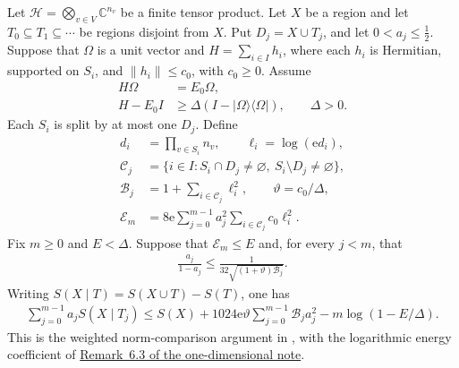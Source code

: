 \begin{theorem}
    \label{thm:buffer_weighted_logarithmic}
    \leanok
    Let $\mathcal H=\bigotimes_{v\in V}\mathbb C^{n_v}$ be a finite
    tensor product. Let $X$ be a region and let
    $T_0\subseteq T_1\subseteq\cdots$ be regions disjoint from $X$.
    Put $D_j=X\cup T_j$, and let $0<a_j\le\tfrac12$.
    Suppose that $\Omega$ is a unit vector and $H=\sum_{i\in I}h_i$,
    where each $h_i$ is Hermitian, supported on $S_i$, and
    $\lVert h_i\rVert\le c_0$, with $c_0\ge0$. Assume
    \begin{align*}
        H\Omega & =E_0\Omega,                                          \\
        H-E_0I  & \ge\Delta(I-\lvert\Omega\rangle\langle\Omega\rvert),
        \qquad \Delta>0.
    \end{align*}
    Each $S_i$ is split by at most one $D_j$. Define
    \begin{align*}
        d_i          & =\prod_{v\in S_i}n_v,\qquad \ell_i=\log(\mathrm e d_i), \\
        \mathcal C_j & =\{i\in I:S_i\cap D_j\ne\varnothing,
        \ S_i\setminus D_j\ne\varnothing\},                                    \\
        \mathcal B_j & =1+\sum_{i\in\mathcal C_j}\ell_i^2,
        \qquad \vartheta=c_0/\Delta,                                           \\
        \mathcal E_m & =8\mathrm e\sum_{j=0}^{m-1}a_j^2
        \sum_{i\in\mathcal C_j}c_0\ell_i^2.
    \end{align*}
    Fix $m\ge0$ and $E<\Delta$. Suppose that $\mathcal E_m\le E$
    and, for every $j<m$, that
    \begin{align*}
        \frac{a_j}{1-a_j}
        \le\frac{1}{32\sqrt{(1+\vartheta)\mathcal B_j}}.
    \end{align*}
    Writing $S(X\mid T)=S(X\cup T)-S(T)$, one has
    \begin{align*}
        \sum_{j=0}^{m-1}a_jS(X\mid T_j)
        \le S(X)+1024\mathrm e\vartheta
        \sum_{j=0}^{m-1}\mathcal B_j a_j^2
        -m\log(1-E/\Delta).
    \end{align*}
    This is the weighted norm-comparison argument in
    \cite[Lemma~3.2]{OpenAI2026AreaLaw}, with the logarithmic energy
    coefficient of
    \href{https://github.com/LionSR/TNLean/blob/67ea93e29f7c088f766b271208a2fde4cccf04a6/docs/notes/one_dimensional_note/part1_arealaw.tex#L711-L734}{Remark~6.3 of the one-dimensional note}.
\end{theorem}
